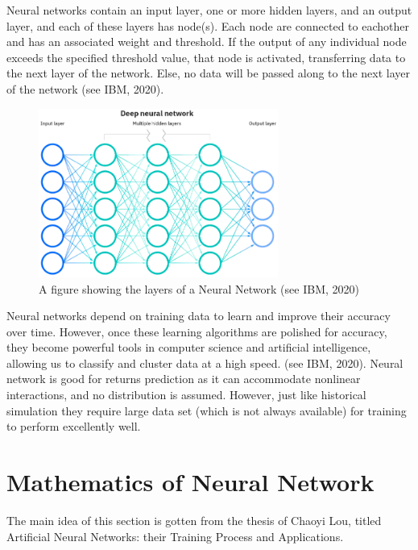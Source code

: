 \documentclass[a4paper,11pt,oneside]{book}
\begin{document}
Neural networks contain an input layer, one or more hidden layers, and an output layer, and each of these layers has node(s). Each node are connected to eachother and has an associated weight and threshold. If the output of any individual node exceeds the specified threshold value, that node is activated, transferring data to the next layer of the network. Else, no data will be passed along to the next layer of the network (see IBM, 2020).
\begin{figure}[!h]
	\centering
	\includegraphics[width=0.7\textwidth]{figures/NN}
	\caption{A figure showing the layers of a Neural Network (see IBM, 2020)}
	\label{firstfig}
\end{figure}\newline
Neural networks depend on training data to learn and improve their accuracy over time. However, once these learning algorithms are polished for accuracy, they become powerful tools in computer science and artificial intelligence, allowing us to classify and cluster data at a high speed. (see IBM, 2020).
\newline\newline
Neural network is good for returns prediction as it can accommodate nonlinear interactions, and no distribution is assumed. However, just like historical simulation they require large data set (which is not always available) for training to perform excellently well.





\section{Mathematics of Neural Network}
The main idea of this section is gotten from the thesis of Chaoyi Lou, titled Artificial Neural Networks:
their Training Process and Applications.
\end{document}
